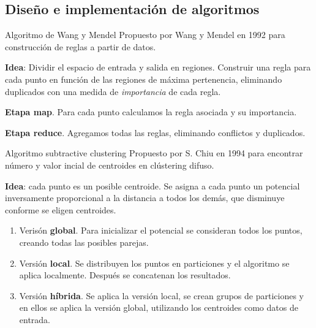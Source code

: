 \documentclass[10pt, spanish]{beamer}
\begin{document}
\subsection{Diseño e implementación de algoritmos}



\begin{frame}{Algoritmo de Wang y Mendel}
  Propuesto por Wang y Mendel en 1992 para construcción de reglas a partir de datos.

  \textbf{Idea}: Dividir el espacio de entrada y salida en regiones. Construir una regla para cada punto en función de las regiones de máxima pertenencia, eliminando duplicados con una medida de \textit{importancia} de cada regla.


  \textbf{Etapa map}. Para cada punto calculamos la regla asociada y su importancia.

  \textbf{Etapa reduce}. Agregamos todas las reglas, eliminando conflictos y duplicados.

\end{frame}


\begin{frame}{Algoritmo subtractive clustering}
  Propuesto por S. Chiu en 1994 para encontrar número y valor incial de centroides en clústering difuso.

  \textbf{Idea}: cada punto es un posible centroide. Se asigna a cada punto un potencial inversamente proporcional a la distancia a todos los demás, que disminuye conforme se eligen centroides.

  \begin{enumerate}
    \item Verisón \textbf{global}. Para inicializar el potencial se consideran todos los puntos, creando todas las posibles parejas.
    \item Versión \textbf{local}. Se distribuyen los puntos en particiones y el algoritmo se aplica localmente. Después se concatenan los resultados.
    \item Versión \textbf{híbrida}. Se aplica la versión local, se crean grupos de particiones y en ellos se aplica la versión global, utilizando los centroides como datos de entrada.
  \end{enumerate}

\end{frame}
\end{document}
